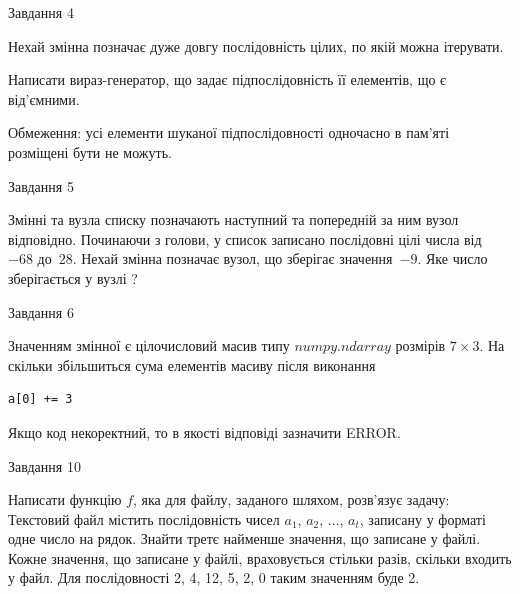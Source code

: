 \documentclass[12pt, ukrainian]{article}
\begin{document}
{\begin{minipage}[t]{8.0cm}
\end{minipage}


               
{\begin{center}Завдання {4}\end{center}}
\vspace{-4mm}
Нехай змінна  позначає дуже довгу послідовність цілих, по якій можна ітерувати.

Написати вираз-генератор, що задає підпослідовність її елементів, що є від'єм\-ни\-ми.

Обмеження: усі елементи шуканої підпослідовності одночасно в пам'яті розміщені бути не можуть.\par

\vspace{10mm}
               
{\begin{center}Завдання {5}\end{center}}
\vspace{-4mm}
Змінні  та  вузла списку позначають наступний та попередній за ним вузол відповідно. Починаючи з голови, у список записано послідовні цілі числа від~$-68$ до~$28$. Нехай змінна  позначає вузол, що зберігає значення~$-9$.
Яке число зберігається у вузлі  ?\par

               
{\begin{center}Завдання {6}\end{center}}
\vspace{-4mm}
Значенням змінної  є цілочисловий масив типу $numpy.ndarray$ розмірів $7{\times}3$. На скільки збільшиться сума елементів масиву  після виконання
\begin{verbatim}
a[0] += 3
\end{verbatim}


Якщо код некоректний, то в якості відповіді зазначити ERROR.\par

               
{\begin{center}Завдання {10}\end{center}}
\vspace{-4mm}

Написати функцію $f$, яка для файлу, заданого шляхом, розв’язує задачу:\\ Текстовий файл містить послідовність чисел $a_1$, $a_2$, $\ldots$, $a_t$, записану у форматі одне число на рядок. Знайти третє найменше значення, що записане у файлі. Кожне значення, що записане у файлі, враховується стільки разів, скільки входить у файл. Для послідовності 2, 4, 12, 5, 2, 0 таким значенням буде 2.

}
\end{document}
